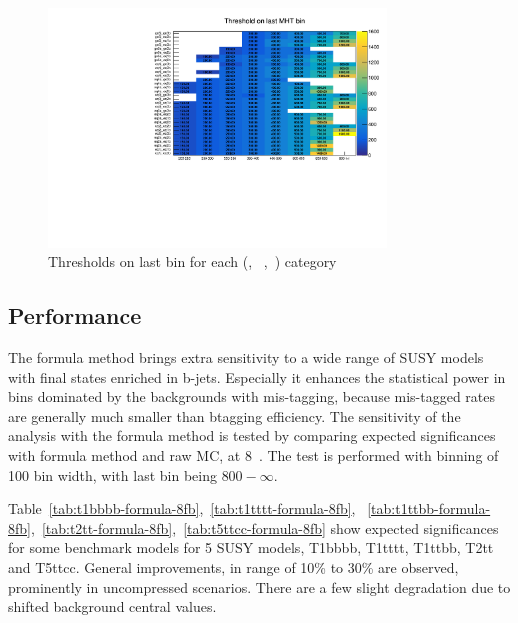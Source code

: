 \begin{figure}[h!]
  \centering
  \includegraphics[width=0.8\textwidth]{figures/btagformula/Ewk_lastMhtBin.pdf} 
  \caption{\label{fig:lastMhtBin} Thresholds on last \mht bin for each (\njet,
  ~\nb,~\scalht) category}
\end{figure}


\subsection{Performance}
The formula method brings extra sensitivity to a wide range of SUSY models with final
states enriched in b-jets.
Especially it enhances the statistical power in bins dominated by the backgrounds 
with mis-tagging, because mis-tagged rates are generally much smaller than 
btagging efficiency. The sensitivity of the analysis with the formula method is 
tested by comparing expected significances with formula method and raw MC, 
at 8~\ifb. The test is performed with \mht binning of 100 \gev bin 
width, with last \mht bin being $800-\infty$.

Table~\ref{tab:t1bbbb-formula-8fb},~\ref{tab:t1tttt-formula-8fb},
~\ref{tab:t1ttbb-formula-8fb},~\ref{tab:t2tt-formula-8fb},~\ref{tab:t5ttcc-formula-8fb} 
show expected significances for some benchmark models for 5 SUSY models, T1bbbb, 
T1tttt, T1ttbb, T2tt and T5ttcc. General improvements, in range of 10\% to 30\%
 are observed, prominently in uncompressed scenarios. There are a few slight 
 degradation due to shifted background central values.

%
\begin{figure}

%



\end{figure}













